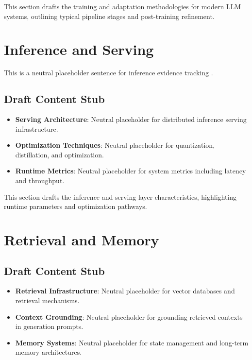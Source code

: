 \documentclass[11pt]{article}
\begin{document}
This section drafts the training and adaptation methodologies for modern LLM systems, outlining typical pipeline stages and post-training refinement.

\section{Inference and Serving}

This is a neutral placeholder sentence for inference evidence tracking \cite{source-kv-cache-2023}.

\subsection{Draft Content Stub}

\begin{itemize}
  \item \textbf{Serving Architecture}: Neutral placeholder for distributed inference serving infrastructure.
  \item \textbf{Optimization Techniques}: Neutral placeholder for quantization, distillation, and optimization.
  \item \textbf{Runtime Metrics}: Neutral placeholder for system metrics including latency and throughput.
\end{itemize}

This section drafts the inference and serving layer characteristics, highlighting runtime parameters and optimization pathways.

\section{Retrieval and Memory}

\subsection{Draft Content Stub}

\begin{itemize}
  \item \textbf{Retrieval Infrastructure}: Neutral placeholder for vector databases and retrieval mechanisms.
  \item \textbf{Context Grounding}: Neutral placeholder for grounding retrieved contexts in generation prompts.
  \item \textbf{Memory Systems}: Neutral placeholder for state management and long-term memory architectures.
\end{itemize}
\end{document}
